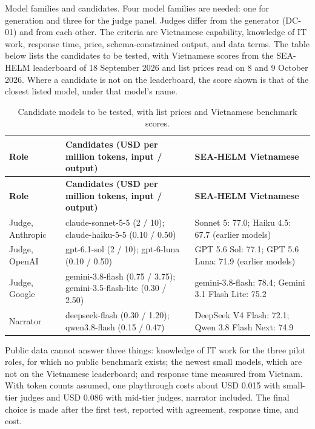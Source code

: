 Model families and candidates. Four model families are needed: one for generation and three for the judge panel. Judges differ from the generator (DC-01) and from each other. The criteria are Vietnamese capability, knowledge of IT work, response time, price, schema-constrained output, and data terms. The table below lists the candidates to be tested, with Vietnamese scores from the SEA-HELM leaderboard of 18 September 2026\cite{r134} and list prices read on 8 and 9 October 2026\cite{r135}. Where a candidate is not on the leaderboard, the score shown is that of the closest listed model, under that model's name.

{\small
\begin{longtable}{|>{\raggedright\arraybackslash}p{}|>{\raggedright\arraybackslash}p{}|>{\raggedright\arraybackslash}p{}|}
\caption{Candidate models to be tested, with list prices and Vietnamese benchmark scores.} \\
\hline
\textbf{Role} & \textbf{Candidates (USD per million tokens, input / output)} & \textbf{SEA-HELM Vietnamese} \\ \hline
\endfirsthead
\hline
\textbf{Role} & \textbf{Candidates (USD per million tokens, input / output)} & \textbf{SEA-HELM Vietnamese} \\ \hline
\endhead
Judge, Anthropic & claude-sonnet-5-5 (2 / 10); claude-haiku-5-5 (0.10 / 0.50) & Sonnet 5: 77.0; Haiku 4.5: 67.7 (earlier models) \\ \hline
Judge, OpenAI & gpt-6.1-sol (2 / 10); gpt-6-luna (0.10 / 0.50) & GPT 5.6 Sol: 77.1; GPT 5.6 Luna: 71.9 (earlier models) \\ \hline
Judge, Google & gemini-3.8-flash (0.75 / 3.75); gemini-3.5-flash-lite (0.30 / 2.50) & gemini-3.8-flash: 78.4; Gemini 3.1 Flash Lite: 75.2 \\ \hline
Narrator & deepseek-flash (0.30 / 1.20); qwen3.8-flash (0.15 / 0.47) & DeepSeek V4 Flash: 72.1; Qwen 3.8 Flash Next: 74.9 \\ \hline
\end{longtable}
}

Public data cannot answer three things: knowledge of IT work for the three pilot roles, for which no public benchmark exists; the newest small models, which are not on the Vietnamese leaderboard; and response time measured from Vietnam. With token counts assumed, one playthrough costs about USD 0.015 with small-tier judges and USD 0.086 with mid-tier judges, narrator included. The final choice is made after the first test, reported with agreement, response time, and cost.

